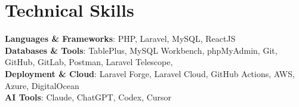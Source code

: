 \documentclass[letterpaper,11pt]{article}
\makeatletter
\newcommand{\resumeProjectHeading}[2]{
    \item
    \begin{tabular*}{0.97\textwidth}{l@{\extracolsep{\fill}}r}
      \small#1 & \hspace{8pt}\small#2 \\
    \end{tabular*}\vspace{-11pt}
}
\newcommand{\resumeSubHeadingListEnd}{\end{itemize}}
\makeatother
\begin{document}



\section{Technical Skills}
 \begin{itemize}[leftmargin=0.15in, label={}]
    \small{\item{
     \textbf{Languages \& Frameworks}{: PHP, Laravel, MySQL, ReactJS} \\
     \textbf{Databases \& Tools}{: TablePlus, MySQL Workbench, phpMyAdmin, Git, GitHub, GitLab, Postman, Laravel Telescope, } \\
     \textbf{Deployment \& Cloud}{: Laravel Forge, Laravel Cloud, GitHub Actions, AWS, Azure, DigitalOcean} \\
     \textbf{AI Tools}{: Claude, ChatGPT, Codex, Cursor} \\
    }}
 \end{itemize}
\end{document}
